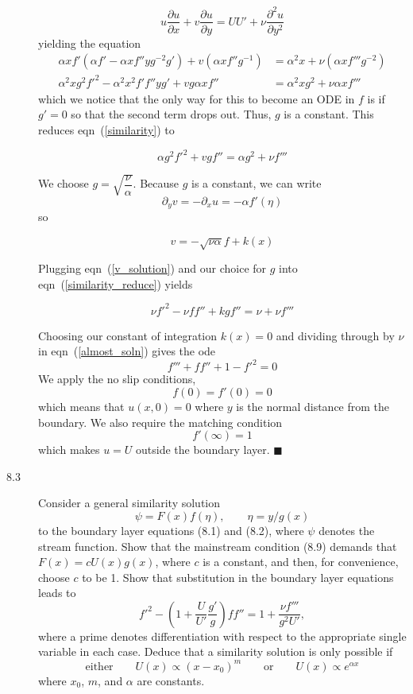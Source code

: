 \documentclass[11pt]{article}
\newcommand{\eqn}[2]{
  \begin{equation}
    \label{#1}
    #2
  \end{equation}
}
\newcommand{\eqr}[1]{eqn~(\ref{#1})}
\newcommand{\fp}[2]{\frac{\partial#1}{\partial#2}}
\newcommand{\fpp}[2]{\frac{\partial^2 #1}{\partial#2^2}}
\newcommand{\p}[1]{\partial_{#1}}
\begin{document}
\begin{description}
$$
  u \fp{u}{x} + v\fp{u}{y} = UU' + \nu\fpp{u}{y}
$$
yielding the equation
\begin{align}
\label{similarity}
\nonumber
  \alpha x f'
  \left(\alpha f' - \alpha x f''yg^{-2}g'\right)
  + v\left(\alpha x f'' g^{-1} \right)
  &=
  \alpha^2 x
  + \nu \left(\alpha x f''' g^{-2} \right)
  \\
%
%
  \alpha^2 x g^2 f'^2
  - \alpha^2 x^2 f'f''yg'
  + vg \alpha x f''
  &=
  \alpha^2 x g^2
  + \nu \alpha x f'''
\end{align}
which we notice that the only way for this to become an ODE in $f$ is if
$g' = 0$ so that the second term drops out. Thus, $g$ is a constant. This reduces
\eqr{similarity} to
\eqn{similarity_reduce}{
  \alpha g^2 f'^2
  + vg f''
  =
  \alpha g^2
  + \nu f'''
}
We choose $g = \sqrt{\dfrac{\nu}{\alpha}}$. Because $g$ is a constant, we can
write
$$
  \p{y}v = -\p{x}u = -\alpha f'(\eta)
$$
so
\eqn{v_solution}{
  v = -\sqrt{\nu\alpha}f + k(x)
}
Plugging \eqr{v_solution} and our choice for $g$ into \eqr{similarity_reduce} yields
\eqn{almost_soln}{
  \nu f'^2
  - \nu f f''
  + k gf''
  =
  \nu
  + \nu f'''
}
Choosing our constant of integration $k(x) = 0$ and dividing through by $\nu$
in \eqr{almost_soln} gives the ode
$$
  f''' + ff'' + 1 - f'^2 = 0
$$
We apply the no slip conditions,
$$
  f(0) = f'(0) = 0
$$
which means that $u(x, 0) = 0$ where $y$ is the normal distance from the boundary.
We also require the matching condition
$$
  f'(\infty) = 1
$$
which makes $u = U$ outside the boundary layer.
%
\hfill $\blacksquare$
\item[8.3] Consider a general similarity solution
$$
  \psi = F(x)f(\eta),
  \qquad
  \eta = y / g(x)
$$
to the boundary layer equations (8.1) and (8.2), where $\psi$ denotes the stream
function. Show that the mainstream condition (8.9) demands that
$F(x) = cU(x)g(x)$, where $c$ is a constant, and then, for convenience, choose
$c$ to be 1. Show that substitution in the boundary layer equations leads to
$$
  f'^2
  - \left(1 + \frac{U}{U'}\frac{g'}{g}\right)ff''
  =
  1 
  + \frac{\nu f'''}{g^2 U'}
  ,
$$
where a prime denotes differentiation with respect to the appropriate single 
variable in each case. Deduce that a similarity solution is only possible if
$$
  \mbox{either}
  \qquad
  U(x) \propto (x - x_0)^m
  \qquad
  \mbox{or}
  \qquad
  U(x) \propto e^{\alpha x}
$$
where $x_0$, $m$, and $\alpha$ are constants.


\end{description}
\end{document}
